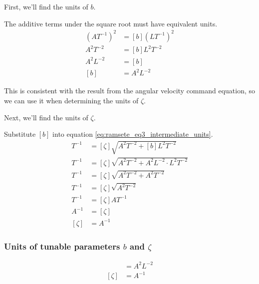First, we'll find the units of $b$.

The additive terms under the square root must have equivalent units.
\begin{align*}
  (A T^{-1})^{2} &= [b] (L T^{-1})^{2} \\
  A^{2} T^{-2} &= [b] L^{2} T^{-2} \\
  A^{2} L^{-2} &= [b] \\
  [b] &= A^{2} L^{-2}
\end{align*}

This is consistent with the result from the angular velocity command equation,
so we can use it when determining the units of $\zeta$.

Next, we'll find the units of $\zeta$.

Substitute $[b]$ into equation \eqref{eq:ramsete_eq3_intermediate_units}.
\begin{align*}
  T^{-1} &= [\zeta] \sqrt{A^{2} T^{-2} + [b] L^{2} T^{-2}} \\
  T^{-1} &= [\zeta] \sqrt{A^{2} T^{-2} + A^{2} L^{-2} \cdot L^{2} T^{-2}} \\
  T^{-1} &= [\zeta] \sqrt{A^{2} T^{-2} + A^{2} T^{-2}} \\
  T^{-1} &= [\zeta] \sqrt{A^{2} T^{-2}} \\
  T^{-1} &= [\zeta] A T^{-1} \\
  A^{-1} &= [\zeta] \\
  [\zeta] &= A^{-1}
\end{align*}

\subsubsection{Units of tunable parameters $b$ and $\zeta$}
\begin{align}
  [b] &= A^{2} L^{-2} \\
  [\zeta] &= A^{-1}
\end{align}
